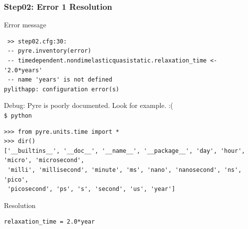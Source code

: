 \documentclass{beamer}
\newcommand{\cmd}[1]{{\tiny\tt \color{ltred}#1}}
\newcommand{\errlabel}[1]{{\small \color{blue}#1}}
\newcommand{\debuginfo}[1]{{\small \color{green}#1}}
\begin{document}
\begin{frame}[fragile]
  \frametitle{Step02: Error 1 Resolution}

\errlabel{Error message}
\begin{lstlisting}
 >> step02.cfg:30:
 -- pyre.inventory(error)
 -- timedependent.nondimelasticquasistatic.relaxation_time <- '2.0*years'
 -- name 'years' is not defined
pylithapp: configuration error(s)
\end{lstlisting}\pause
\errlabel{Debug:} \debuginfo{Pyre is poorly documented. Look for example. :(}\pause\\
\cmd{\$ python}
\begin{lstlisting}
>>> from pyre.units.time import *
>>> dir()
['__builtins__', '__doc__', '__name__', '__package__', 'day', 'hour', 'micro', 'microsecond',
 'milli', 'millisecond', 'minute', 'ms', 'nano', 'nanosecond', 'ns', 'pico',
 'picosecond', 'ps', 's', 'second', 'us', 'year']
\end{lstlisting}
\errlabel{Resolution}
\begin{lstlisting}
relaxation_time = 2.0*year
\end{lstlisting}

\end{frame}
\end{document}
